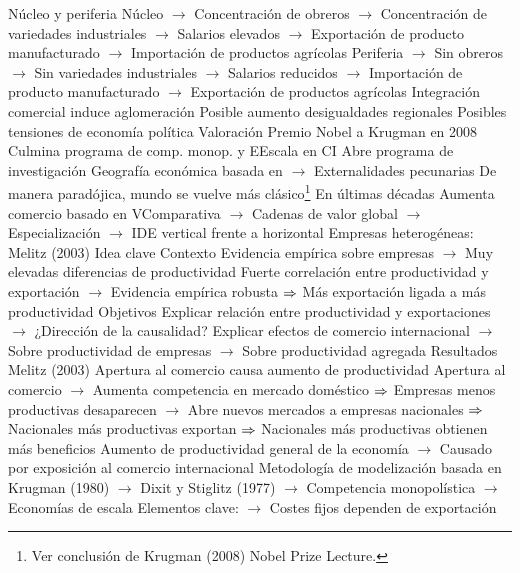 \documentclass{nuevotema}
\begin{document}
\begin{esquemal}
				\4 Núcleo y periferia
				\4[] Núcleo
				\4[] $\to$ Concentración de obreros
				\4[] $\to$ Concentración de variedades industriales
				\4[] $\to$ Salarios elevados
				\4[] $\to$ Exportación de producto manufacturado
				\4[] $\to$ Importación de productos agrícolas
				\4[] Periferia
				\4[] $\to$ Sin obreros
				\4[] $\to$ Sin variedades industriales
				\4[] $\to$ Salarios reducidos
				\4[] $\to$ Importación de producto manufacturado
				\4[] $\to$ Exportación de productos agrícolas
				\4 Integración comercial induce aglomeración
				\4[] Posible aumento desigualdades regionales
				\4[] Posibles tensiones de economía política
			\3 Valoración
				\4 Premio Nobel a Krugman en 2008
				\4[] Culmina programa de comp. monop. y EEscala en CI
				\4 Abre programa de investigación
				\4[] Geografía económica basada en
				\4[] $\to$ Externalidades pecunarias
				\4 De manera paradójica, mundo se vuelve más clásico\footnote{Ver conclusión de Krugman (2008) Nobel Prize Lecture.}
				\4[] En últimas décadas
				\4[] Aumenta comercio basado en VComparativa
				\4[] $\to$ Cadenas de valor global
				\4[] $\to$ Especialización
				\4[] $\to$ IDE vertical frente a horizontal
		\2 Empresas heterogéneas: Melitz (2003)
			\3 Idea clave
				\4 Contexto
				\4[] Evidencia empírica sobre empresas
				\4[] $\to$ Muy elevadas diferencias de productividad
				\4[] Fuerte correlación entre productividad y exportación
				\4[] $\to$ Evidencia empírica robusta
				\4[] $\Rightarrow$ Más exportación ligada a más productividad
				\4 Objetivos
				\4[] Explicar relación entre productividad y exportaciones
				\4[] $\to$ ¿Dirección de la causalidad?
				\4[] Explicar efectos de comercio internacional
				\4[] $\to$ Sobre productividad de empresas
				\4[] $\to$ Sobre productividad agregada
				\4 Resultados
				\4[] Melitz (2003)
				\4[] Apertura al comercio causa aumento de productividad
				\4[] Apertura al comercio
				\4[] $\to$ Aumenta competencia en mercado doméstico
				\4[] $\Rightarrow$ Empresas menos productivas desaparecen
				\4[] $\to$ Abre nuevos mercados a empresas nacionales
				\4[] $\Rightarrow$ Nacionales más productivas exportan
				\4[] $\Rightarrow$ Nacionales más productivas obtienen más beneficios
				\4[] Aumento de productividad general de la economía
				\4[] $\to$ Causado por exposición al comercio internacional
				\4[] Metodología de modelización basada en Krugman (1980)
				\4[] $\to$ Dixit y Stiglitz (1977)
				\4[] $\to$ Competencia monopolística
				\4[] $\to$ Economías de escala
				\4[] Elementos clave:
				\4[] $\to$ Costes fijos dependen de exportación

\end{esquemal}
\end{document}
